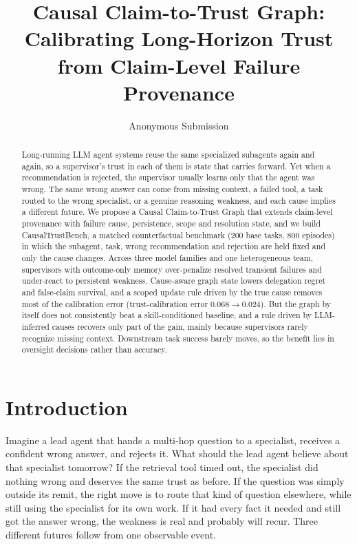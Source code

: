 \documentclass[letterpaper]{article}
\title{Causal Claim-to-Trust Graph: Calibrating Long-Horizon Trust\\from Claim-Level Failure Provenance}
\author{Anonymous Submission}
\begin{document}
\maketitle

\begin{abstract}
Long-running LLM agent systems reuse the same specialized subagents again and again, so a supervisor's trust in each of them is state that carries forward. Yet when a recommendation is rejected, the supervisor usually learns only that the agent was wrong. The same wrong answer can come from missing context, a failed tool, a task routed to the wrong specialist, or a genuine reasoning weakness, and each cause implies a different future. We propose a Causal Claim-to-Trust Graph that extends claim-level provenance with failure cause, persistence, scope and resolution state, and we build CausalTrustBench, a matched counterfactual benchmark (200 base tasks, 800 episodes) in which the subagent, task, wrong recommendation and rejection are held fixed and only the cause changes. Across three model families and one heterogeneous team, supervisors with outcome-only memory over-penalize resolved transient failures and under-react to persistent weakness. Cause-aware graph state lowers delegation regret and false-claim survival, and a scoped update rule driven by the true cause removes most of the calibration error (trust-calibration error $0.068\to0.024$). But the graph by itself does not consistently beat a skill-conditioned baseline, and a rule driven by LLM-inferred causes recovers only part of the gain, mainly because supervisors rarely recognize missing context. Downstream task success barely moves, so the benefit lies in oversight decisions rather than accuracy.
\end{abstract}

\section{Introduction}
Imagine a lead agent that hands a multi-hop question to a specialist, receives a confident wrong answer, and rejects it. What should the lead agent believe about that specialist tomorrow? If the retrieval tool timed out, the specialist did nothing wrong and deserves the same trust as before. If the question was simply outside its remit, the right move is to route that kind of question elsewhere, while still using the specialist for its own work. If it had every fact it needed and still got the answer wrong, the weakness is real and probably will recur. Three different futures follow from one observable event.
\end{document}
